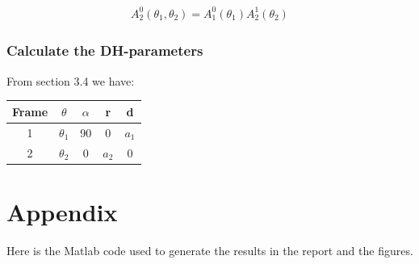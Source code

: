 \documentclass[a4paper, titlepage]{article}
\begin{document}
\begin{equation}
\begin{split}
A^0_{2}(\theta_{1},\theta_{2}) = A^0_{1}(\theta_{1})A^1_{2}(\theta_{2}) 
\end{split}
\end{equation}



\subsubsection{Calculate the DH-parameters}

From section 3.4 we have:

\begin{center}
\begin{tabular}{||c c c c c||} 
 \hline
 Frame & $\theta$ & $\alpha$ & r & d \\ [0.5ex] 
 \hline\hline
 1 & $\theta_{1}$ & 90 & 0 & $a_{1}$ \\
 \hline
2 & $\theta_{2}$ & 0 & $a_{2}$ & 0 \\
 \hline
 \hline
\end{tabular}
\end{center}


\clearpage


\clearpage
\appendix

\section{Appendix}
Here is the Matlab code used to generate the results in the report and the figures.




\end{document}
